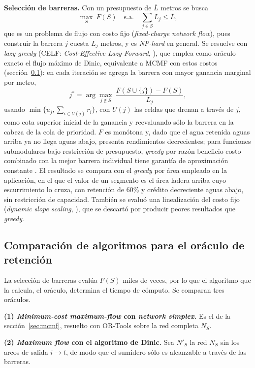 \textbf{Selección de barreras.} Con un presupuesto de $\bar L$ metros se busca
\begin{equation}
\max_{S}\ F(S)\quad\text{s.a.}\quad \sum_{j\in S}L_j\le \bar L ,
\end{equation}
que es un problema de flujo con costo fijo (\emph{fixed-charge network flow}), pues construir la barrera $j$ cuesta $L_j$ metros, y es \emph{NP-hard} en general. Se resuelve con \emph{lazy greedy} (CELF: \emph{Cost-Effective Lazy Forward}, ), que emplea como oráculo exacto el flujo máximo de Dinic, equivalente a MCMF con estos costos (sección~\ref{sec:oraculos}): en cada iteración se agrega la barrera con mayor ganancia marginal por metro,
\begin{equation}
j^\ast=\arg\max_{j\notin S}\ \frac{F(S\cup\{j\})-F(S)}{L_j},
\end{equation}
usando $\min\{u_j,\sum_{i\in U(j)}r_i\}$, con $U(j)$ las celdas que drenan a través de $j$, como cota superior inicial de la ganancia y reevaluando sólo la barrera en la cabeza de la cola de prioridad. $F$ es monótona y, dado que el agua retenida aguas arriba ya no llega aguas abajo, presenta rendimientos decrecientes; para funciones submodulares bajo restricción de presupuesto, \emph{greedy} por razón beneficio-costo combinado con la mejor barrera individual tiene garantía de aproximación constante . El resultado se compara con el \emph{greedy} por área empleado en la aplicación, en el que el valor de un segmento es el área ladera arriba cuyo escurrimiento lo cruza, con retención de 60\% y crédito decreciente aguas abajo, sin restricción de capacidad. También se evaluó una linealización del costo fijo (\emph{dynamic slope scaling}, ), que se descartó por producir peores resultados que \emph{greedy}.

\subsection{Comparación de algoritmos para el oráculo de retención}\label{sec:oraculos}

La selección de barreras evalúa $F(S)$ miles de veces, por lo que el algoritmo que la calcula, el oráculo, determina el tiempo de cómputo. Se comparan tres oráculos.

\textbf{(1) \emph{Minimum-cost maximum-flow} con \emph{network simplex}.} Es el de la sección~\ref{sec:mcmf}, resuelto con OR-Tools sobre la red completa $N_S$.

\textbf{(2) \emph{Maximum flow} con el algoritmo de Dinic.} Sea $N'_S$ la red $N_S$ sin los arcos de salida $i\to t$, de modo que el sumidero sólo es alcanzable a través de las barreras.

